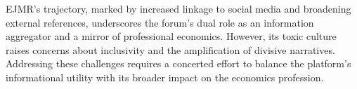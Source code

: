 \documentclass[PP]{AEA}
\begin{document}
EJMR's trajectory, marked by increased linkage to social media and broadening external references, underscores the forum's dual role as an information aggregator and a mirror of professional economics. However, its toxic culture raises concerns about inclusivity and the amplification of divisive narratives. Addressing these challenges requires a concerted effort to balance the platform's informational utility with its broader impact on the economics profession.




\end{document}

